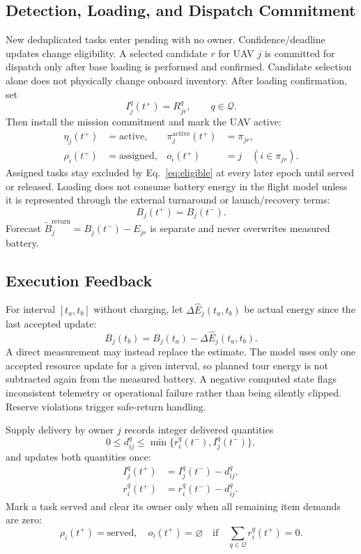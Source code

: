 \documentclass[conference]{IEEEtran}
\begin{document}
\subsection{Detection, Loading, and Dispatch Commitment}
New deduplicated tasks enter pending with no owner. Confidence/deadline updates change eligibility. A selected candidate $r$ for UAV $j$ is committed for dispatch only after base loading is performed and confirmed. Candidate selection alone does not physically change onboard inventory. After loading confirmation, set
\begin{equation}
I_j^q(t^+)=R_{jr}^q,\qquad q\in\mathcal Q.
\end{equation}
Then install the mission commitment and mark the UAV active:
\begin{align}
\eta_j(t^+)&=\mathrm{active},&
\pi_j^{\mathrm{active}}(t^+)&=\pi_{jr},\\
\rho_i(t^+)&=\mathrm{assigned},&
o_i(t^+)&=j\quad(i\in\pi_{jr}).
\end{align}
Assigned tasks stay excluded by Eq.~\eqref{eq:eligible} at every later epoch until served or released. Loading does not consume battery energy in the flight model unless it is represented through the external turnaround or launch/recovery terms:
\begin{equation}
B_j(t^+)=B_j(t^-).
\end{equation}
Forecast $\widetilde B_j^{\mathrm{return}}=B_j(t^-)-E_{jr}$ is separate and never overwrites measured battery.

\subsection{Execution Feedback}
For interval $[t_a,t_b]$ without charging, let $\Delta\widehat E_j(t_a,t_b)$ be actual energy since the last accepted update:
\begin{equation}
B_j(t_b)=B_j(t_a)-\Delta\widehat E_j(t_a,t_b).
\end{equation}
A direct measurement may instead replace the estimate. The model uses only one accepted resource update for a given interval, so planned tour energy is not subtracted again from the measured battery. A negative computed state flags inconsistent telemetry or operational failure rather than being silently clipped. Reserve violations trigger safe-return handling.

Supply delivery by owner $j$ records integer delivered quantities
\begin{equation}
0\leq d_{ij}^q\leq\min\{r_i^q(t^-),I_j^q(t^-)\},
\end{equation}
and updates both quantities once:
\begin{align}
I_j^q(t^+)&=I_j^q(t^-)-d_{ij}^q,\\
r_i^q(t^+)&=r_i^q(t^-)-d_{ij}^q.
\end{align}
Mark a task served and clear its owner only when all remaining item demands are zero:
\begin{equation}
\rho_i(t^+)=\mathrm{served},\quad o_i(t^+)=\varnothing
\quad\text{if}\quad \sum_{q\in\mathcal Q}r_i^q(t^+)=0.
\end{equation}
\end{document}
